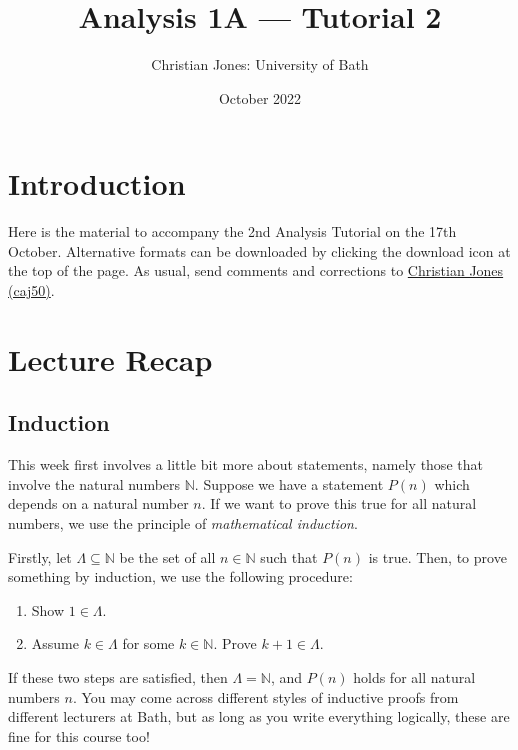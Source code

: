 \documentclass[
  10pt,
  a4paper]{article}
\title{Analysis 1A --- Tutorial 2}
\author{Christian Jones: University of Bath}
\date{October 2022}
\providecommand{\tightlist}{%
  \setlength{\itemsep}{0pt}\setlength{\parskip}{0pt}}
\theoremstyle{plain}
\theoremstyle{definition}
\theoremstyle{plain}
\theoremstyle{plain}
\theoremstyle{plain}
\theoremstyle{plain}
\theoremstyle{definition}
\theoremstyle{definition}
\newtheorem*{Order Axioms*}{Order Axioms}\newtheorem{Order Axioms}{Order Axioms}[section]
\theoremstyle{remark}
\theoremstyle{remark}
\begin{document}
\maketitle

{
\setcounter{tocdepth}{2}
\tableofcontents
}
\newpage
{}

\hypertarget{introduction}{%
\section*{Introduction}\label{introduction}}

Here is the material to accompany the 2nd Analysis Tutorial on the 17th October. Alternative formats can be downloaded by clicking the download icon at the top of the page. As usual, send comments and corrections to \href{mailto:caj50@bath.ac.uk}{Christian Jones (caj50)}.

\hypertarget{lecture-recap}{%
\section{Lecture Recap}\label{lecture-recap}}

\hypertarget{induction}{%
\subsection{Induction}\label{induction}}

This week first involves a little bit more about statements, namely those that involve the natural numbers \(\mathbb{N}\). Suppose we have a statement \(P(n)\) which depends on a natural number \(n\). If we want to prove this true for all natural numbers, we use the principle of \emph{mathematical induction}.

Firstly, let \(\Lambda \subseteq \mathbb{N}\) be the set of all \(n \in \mathbb{N}\) such that \(P(n)\) is true. Then, to prove something by induction, we use the following procedure:

\begin{enumerate}
\def\labelenumi{\arabic{enumi}.}
\tightlist
\item
  Show \(1 \in \Lambda\).
\item
  Assume \(k \in \Lambda\) for some \(k \in \mathbb{N}\). Prove \(k + 1 \in \Lambda\).
\end{enumerate}

If these two steps are satisfied, then \(\Lambda = \mathbb{N}\), and \(P(n)\) holds for all natural numbers \(n\). You may come across different styles of inductive proofs from different lecturers at Bath, but as long as you write everything logically, these are fine for this course too!
\end{document}

